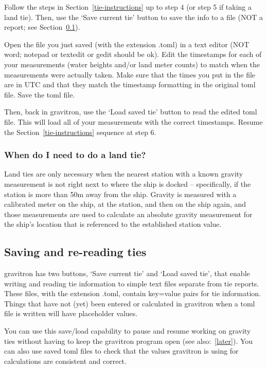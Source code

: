 \documentclass{pfpe-manual}
\begin{document}
Follow the steps in Section~\ref{tie-instructions} up to step 4 (or step 5 if taking a land tie). Then, use the `Save current tie' button to save the info to a file (NOT a report; see Section~\ref{save-re}). 

Open the file you just saved (with the extension .toml) in a text editor (NOT word; notepad or textedit or gedit should be ok). Edit the timestamps for each of your measurements (water heights and/or land meter counts) to match when the measurements were actually taken. Make sure that the times you put in the file are in UTC and that they match the timestamp formatting in the original toml file. Save the toml file. 

Then, back in gravitron, use the `Load saved tie' button to read the edited toml file. This will load all of your measurements with the correct timestamps. Resume the Section~\ref{tie-instructions} sequence at step 6.

\subsubsection{When do I need to do a land tie?}
Land ties are only necessary when the nearest station with a known gravity measurement is not right next to where the ship is docked -- specifically, if the station is more than 50m away from the ship. Gravity is measured with a calibrated meter on the ship, at the station, and then on the ship again, and those measurements are used to calculate an absolute gravity measurement for the ship's location that is referenced to the established station value.

\subsection{Saving and re-reading ties}
\label{save-re}
gravitron has two buttons, `Save current tie' and `Load saved tie', that enable writing and reading tie information to simple text files separate from tie reports. These files, with the extension .toml, contain key=value pairs for tie information. Things that have not (yet) been entered or calculated in gravitron when a toml file is written will have placeholder values.

You can use this save/load capability to pause and resume working on gravity ties without having to keep the gravitron program open (see also:~\ref{later}). You can also use saved toml files to check that the values gravitron is using for calculations are consistent and correct. 
\end{document}
